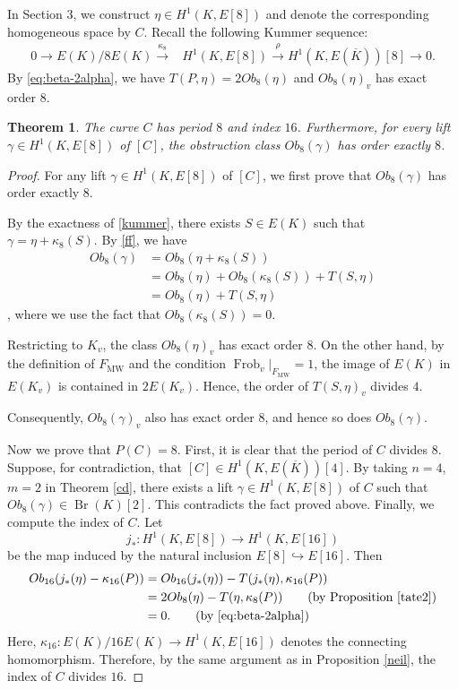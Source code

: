 \documentclass[11pt,a4paper]{amsart}
\newtheorem{theorem}{Theorem}[section]
\theoremstyle{definition}
\newcommand{\Br}{\operatorname{Br}}
\numberwithin{equation}{section}
\begin{document}
In Section $3$, we construct $\eta\in H^1(K,E[8])$ and denote the corresponding homogeneous space by $C$.	Recall the following Kummer sequence:\label{tt}
 \begin{align}\label{kummer}
 		0\rightarrow E(K)/8E(K)\xrightarrow{\kappa_8} &H^1(K,E[8])\xrightarrow{\rho} H^1(K,E(\overline{K}))[8]\rightarrow 0.
 \end{align}
By \eqref{eq:beta-2alpha}, we have $T(P,\eta)=2Ob_8(\eta)$ and $Ob_8(\eta)_{v}$ has exact order $8$. 
\begin{theorem}\label{22}
	The curve \(C\) has period \(8\) and index \(16\). Furthermore, for every lift \(\gamma\in H^1(K,E[8])\) of  \([C]\), the obstruction class \(Ob_8(\gamma)\) has  order exactly \(8\). 
\end{theorem}
\begin{proof}
	For any lift $\gamma\in H^1(K,E[8])$ of $[C]$, we first prove that
	$Ob_8(\gamma)$ has  order  exactly $8$.
	
	By the exactness of \eqref{kummer}, there exists
	$S\in E(K)$ such that $\gamma=\eta+\kappa_8(S).$
	By \eqref{ff}, we have
	\[
	\begin{aligned}
		Ob_8(\gamma)
		&=Ob_8(\eta+\kappa_8(S))\\
		&=Ob_8(\eta)+Ob_8(\kappa_8(S))
		+T(S,\eta)\\
		&=Ob_8(\eta)+T(S,\eta)
	\end{aligned}
	\]
	, where we use the fact that $Ob_8(\kappa_8(S))=0$.
	
	Restricting to $K_{v}$, the class
	$Ob_8(\eta)_{v}$ has exact order $8$. On the other hand, by the
	definition of $F_{\mathrm{MW}}$ and the condition $\operatorname{Frob}_{v}|_{F_{\mathrm{MW}}}=1$,
	the image of $E(K)$ in $E(K_{v})$ is contained in
	$2E(K_{v})$. Hence, the order of $	T(S,\eta)_{v}$
	divides \(4\).
	
 Consequently,	$Ob_8(\gamma)_{v}$
	also has exact order \(8\), and hence so does \(Ob_8(\gamma)\).
	
	
Now we prove that $P(C)=8$. First, it is clear that
the period of $C$ divides $8$. Suppose, for contradiction, that
$[C]\in H^1(K,E(\overline{K}))[4]$. By taking $n=4$, $m=2$ in  Theorem \ref{cd}, there exists a lift
$
\gamma\in H^1(K,E[8])
$
of $C$ such that
$
Ob_8(\gamma)\in \Br(K)[2].
$
This contradicts the fact proved above.
 Finally, we compute the index of $C$. Let
 \[
 j_*:H^1(K,E[8])\longrightarrow H^1(K,E[16])
 \]
 be the map induced by the natural inclusion $ E[8]\hookrightarrow E[16]$.
 Then
 \[
 \begin{aligned}
 	Ob_{16}(j_*(\eta)-\kappa_{16}(P))
 	&=
 	Ob_{16}(j_*(\eta))
 	-T(j_*(\eta),\kappa_{16}(P))\\
 	&=
 	2Ob_8(\eta)-T(\eta,\kappa_8(P))
 	\qquad\text{(by Proposition \ref{tate2})}\\
 	&=0.   \qquad \text{(by \eqref{eq:beta-2alpha})}
 \end{aligned}
 \]
 Here,
$
 \kappa_{16}:E(K)/16E(K)\longrightarrow H^1(K,E[16])
$
 denotes the connecting homomorphism. Therefore,
 by the same argument as in Proposition \ref{neil}, the index of \(C\)
 divides \(16\).
 

\end{proof}
\end{document}
